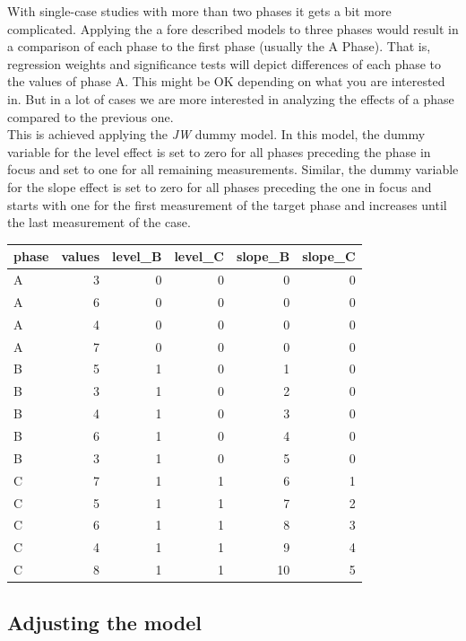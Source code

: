 \documentclass[
]{book}
\begin{document}
With single-case studies with more than two phases it gets a bit more complicated. Applying the a fore described models to three phases would result in a comparison of each phase to the first phase (usually the A Phase). That is, regression weights and significance tests will depict differences of each phase to the values of phase A. This might be OK depending on what you are interested in. But in a lot of cases we are more interested in analyzing the effects of a phase compared to the previous one.\\
This is achieved applying the \emph{JW} dummy model. In this model, the dummy variable for the level effect is set to zero for all phases preceding the phase in focus and set to one for all remaining measurements. Similar, the dummy variable for the slope effect is set to zero for all phases preceding the one in focus and starts with one for the first measurement of the target phase and increases until the last measurement of the case.

\begin{tabular}{l|r|r|r|r|r}
\hline
phase & values & level\_B & level\_C & slope\_B & slope\_C\\
\hline
A & 3 & 0 & 0 & 0 & 0\\
\hline
A & 6 & 0 & 0 & 0 & 0\\
\hline
A & 4 & 0 & 0 & 0 & 0\\
\hline
A & 7 & 0 & 0 & 0 & 0\\
\hline
B & 5 & 1 & 0 & 1 & 0\\
\hline
B & 3 & 1 & 0 & 2 & 0\\
\hline
B & 4 & 1 & 0 & 3 & 0\\
\hline
B & 6 & 1 & 0 & 4 & 0\\
\hline
B & 3 & 1 & 0 & 5 & 0\\
\hline
C & 7 & 1 & 1 & 6 & 1\\
\hline
C & 5 & 1 & 1 & 7 & 2\\
\hline
C & 6 & 1 & 1 & 8 & 3\\
\hline
C & 4 & 1 & 1 & 9 & 4\\
\hline
C & 8 & 1 & 1 & 10 & 5\\
\hline
\end{tabular}

\hypertarget{adjusting-the-model}{%
\subsection{Adjusting the model}\label{adjusting-the-model}}
\end{document}
